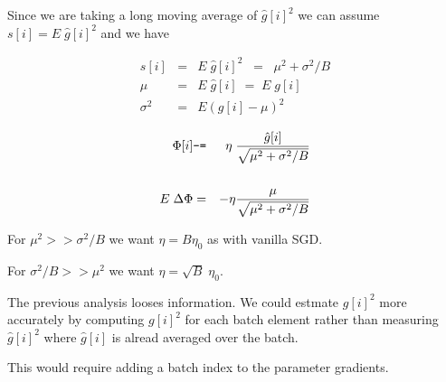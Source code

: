 {\vfill
Since we are taking a long moving average of $\hat{g}[i]^2$ we can assume $s[i] = E\;\hat{g}[i]^2$ and we have

      \begin{eqnarray*}
        s[i] & = & E \;\hat{g}[i]^2 \;\; = \;\; \mu^2 + \sigma^2/B \\
 \mu & = & E\;\hat{g}[i] \; = \; E\;g[i]\\
 \sigma^2 & = & E (g[i] - \mu)^2
  \end{eqnarray*}  


\vfill
\begin{eqnarray*}
\Phi[i] & \mbox{\tt -=} & \eta\;\frac{\hat{g}[i]}{\sqrt{\mu^2 + \sigma^2/B}} \\
\\
E\;\Delta\Phi & = & - \eta \frac{\mu}{\sqrt{\mu^2 + \sigma^2/B}} \\
\end{eqnarray*}

For $\mu^2 >> \sigma^2/B$ we want $\eta = B \eta_0$ as with vanilla SGD.

\vfill
For $\sigma^2/B >> \mu^2$ we want $\eta = \sqrt{B} \;\eta_0$.



The previous analysis looses information.  We could estmate $g[i]^2$ more accurately by computing $g[i]^2$ for each batch element
rather than measuring $\hat{g}[i]^2$ where $\hat{g}[i]$ is alread averaged over the batch.

\vfill
This would require adding a batch index
to the parameter gradients.


} 
